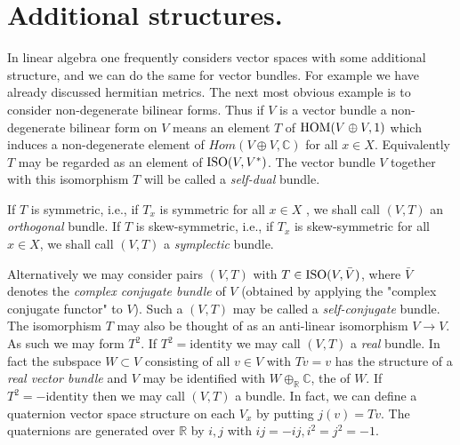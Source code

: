 
\section{Additional structures.} In linear algebra one frequently considers vector spaces with some additional structure, and we can do the same for vector bundles. For example we have already discussed hermitian metrics. The next most obvious example is to consider non-degenerate bilinear forms. Thus if $V$ is a vector bundle a non-degenerate bilinear form on $V$ means an element $T$ of $\operatorname{HOM}(V \oplus V, 1)$ which induces a non-degenerate element of $Hom(V \oplus V, \mathbb{C})$ for all $x \in X$. Equivalently $T$ may be regarded as an element of $\operatorname{ISO}(V, V^*)$. The vector bundle $V$ together with this isomorphism $T$ will be called a \textit{self-dual} bundle. \par 

If $T$ is symmetric, i.e., if $T_x$ is symmetric for all $x \in X$ , we shall call $(V, T)$ an \textit{orthogonal} bundle. If $T$ is skew-symmetric, i.e., if $T_x$ is skew-symmetric for all $x \in X$, we shall call $(V, T)$ a \textit{symplectic} bundle. \par 

Alternatively we may consider pairs $(V, T)$ with $T \in \operatorname{ISO}(V, \bar{V})$, where $\bar{V}$ denotes the \textit{complex conjugate bundle} of $V$ (obtained by applying the "complex conjugate functor" to $V$). Such a $(V, T)$ may be called a \textit{self-conjugate} bundle. The isomorphism $T$ may also be thought of as an anti-linear isomorphism $V \to V$. As such we may form $T^2$. If $T^2 = \text{identity}$ we may call $(V, T)$ a \textit{real} bundle. In fact the subspace $W \subset V$ consisting of all $v \in V$ with $Tv = v$ has the structure of a\textit{ real vector bundle} and $V$ may be identified with $W \oplus_\mathbb{R} \mathbb{C}$, the  of $W$. If $T^2 = -\text{identity}$ then we may call $(V, T)$ a  bundle. In fact, we can define a quaternion vector space structure on each $V_x$ by putting $j(v) = Tv$. The quaternions are generated over $\mathbb{R}$ by $i, j$ with $ij = -ij, i^2 = j^2 = -1$. \par 

